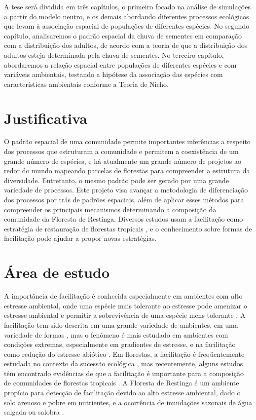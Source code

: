 \documentclass[twoside,12pt,a4paper]{report}
\begin{document}
A tese será dividida em três capítulos, o primeiro focado na análise de simulações a partir
do modelo neutro, e os demais abordando diferentes processos ecológicos que levam à
associação espacial de populações de diferentes espécies. No segundo capítulo, analisaremos o
padrão espacial da chuva de sementes em comparação com a distribuição dos adultos, de acordo com a
teoria de que a distribuição dos adultos esteja determinada pela chuva de sementes. No
terceiro
capítulo, abordaremos a relação espacial entre populações de diferentes espécies e com variáveis
ambientais, testando a hipótese da associação das espécies com características ambientais conforme a
Teoria de Nicho.


\section{Justificativa}

O padrão espacial de uma comunidade permite importantes inferências a respeito dos processos que
estruturam a comunidade e permitem a coexistência de um grande número de espécies, e há atualmente
um grande número de projetos ao redor do mundo mapeando parcelas de florestas para compreender a
estrutura da diversidade. Entretanto, o mesmo padrão pode ser gerado por uma grande variedade de
processos. Este projeto visa avançar a metodologia de diferenciação dos processos por trás de
padrões espaciais, além de aplicar esses métodos para compreender os principais mecanismos
determinando a composição da comunidade da Floresta de Restinga. Diversos estudos usam a facilitação
como estratégia de restauração de florestas tropicais \citep{Zwiener2014,ref}, e o
conhecimento sobre formas de facilitação pode ajudar a propor novas estratégias.

\section{Área de estudo}
A importância de facilitação é conhecida especialmente em ambientes com alto estresse
ambiental, onde uma espécie mais tolerante ao estresse pode amenizar o estresse ambiental e
permitir a sobrevivência de uma espécie mens tolerante \citep{BertnessHacker1994,
BertnessCallaway1994}. 
A facilitação tem sido descrita em uma grande variedade de ambientes, em
uma variedade de formas \citep{McIntire2014}, mas o fenômeno é mais estudado em ambientes com
condições extremas, especialmente em gradientes de estresse, e na facilitação como redução do
estresse abiótico \citep{Brooker2008}. Em florestas, a facilitação é freqüentemente
estudada no contexto da sucessão ecológica \citep{refs refs refs}, mas recentemente, alguns
estudos têm encontrado evidências de que a facilitação é importante para a composição de
comunidades de florestas tropicais
\citep{Ledo2015,refs}. A Floresta de Restinga é um ambiente propício para detecção de facilitação devido ao alto estresse
ambiental, dado o solo arenoso e pobre em nutrientes, e a ocorrência de inundações sazonais de água
salgada ou salobra \citep{TODO refs}. 
\end{document}
